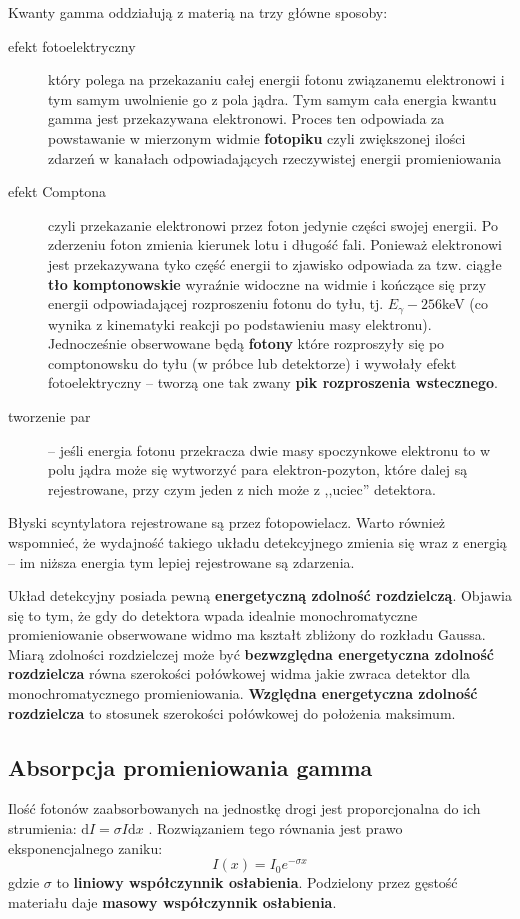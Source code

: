 \documentclass[10pt, twocolumn]{article}
\begin{document}
Kwanty gamma oddziałują z materią na trzy główne sposoby:
\begin{description}
   \item[efekt fotoelektryczny] który polega na przekazaniu całej energii fotonu związanemu elektronowi i tym samym uwolnienie go z pola jądra. Tym samym cała energia kwantu gamma jest przekazywana elektronowi. Proces ten odpowiada za powstawanie w mierzonym widmie \textbf{fotopiku} czyli zwiększonej ilości zdarzeń w kanałach odpowiadających rzeczywistej energii promieniowania
   \item[efekt Comptona] czyli przekazanie elektronowi przez foton jedynie części swojej energii. Po zderzeniu foton zmienia kierunek lotu i długość fali. Ponieważ elektronowi jest przekazywana tyko część energii to zjawisko odpowiada za tzw. ciągłe \textbf{tło komptonowskie} wyraźnie widoczne na widmie i kończące się przy energii odpowiadającej rozproszeniu fotonu do tyłu, tj. $E_\gamma - 256$keV \cite{agh} (co wynika z kinematyki reakcji po podstawieniu masy elektronu). Jednocześnie obserwowane będą \textbf{fotony} które rozproszyły się po comptonowsku do tyłu (w próbce lub detektorze) i wywołały efekt fotoelektryczny -- tworzą one tak zwany \textbf{pik rozproszenia wstecznego}.
   \item[tworzenie par] -- jeśli energia fotonu przekracza dwie masy spoczynkowe elektronu to w polu jądra może się wytworzyć para elektron-pozyton, które dalej są rejestrowane, przy czym jeden z nich może z ,,uciec'' detektora.
\end{description}

Błyski scyntylatora rejestrowane są przez fotopowielacz. Warto również wspomnieć, że wydajność takiego układu detekcyjnego zmienia się wraz z energią -- im niższa energia tym lepiej rejestrowane są zdarzenia.

Układ detekcyjny posiada pewną \textbf{energetyczną zdolność rozdzielczą}. Objawia się to tym, że gdy do detektora wpada idealnie monochromatyczne promieniowanie obserwowane widmo ma kształt zbliżony do rozkładu Gaussa. Miarą zdolności rozdzielczej może być \textbf{bezwzględna energetyczna zdolność rozdzielcza} równa szerokości połówkowej widma jakie zwraca detektor dla monochromatycznego promieniowania. \textbf{Względna energetyczna zdolność rozdzielcza} to stosunek szerokości połówkowej do położenia maksimum.

\subsection*{Absorpcja promieniowania gamma}
Ilość fotonów zaabsorbowanych na jednostkę drogi jest proporcjonalna do ich strumienia: $\mathrm{d}I = \sigma I \mathrm{d}x$ \cite{agh}. Rozwiązaniem tego równania jest prawo eksponencjalnego zaniku:
\begin{equation}
  \label{eq:absorbcja}
  I(x) = I_0 e^{-\sigma x}
\end{equation}
gdzie $\sigma$ to \textbf{liniowy współczynnik osłabienia}. Podzielony przez gęstość materiału daje \textbf{masowy współczynnik osłabienia}.
\end{document}
